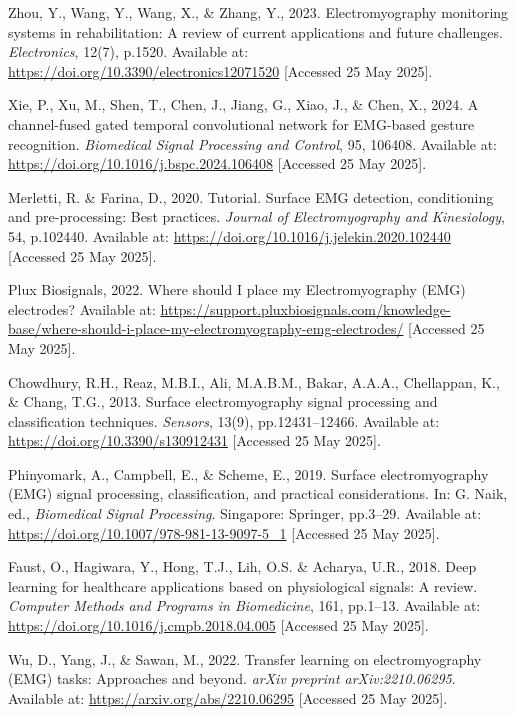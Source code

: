 \begin{multicols}{2}
\begin{thebibliography}{99}\footnotesize 

Zhou, Y., Wang, Y., Wang, X., \& Zhang, Y., 2023. Electromyography monitoring systems in rehabilitation: A review of current applications and future challenges. \textit{Electronics}, 12(7), p.1520. Available at: \url{https://doi.org/10.3390/electronics12071520} [Accessed 25 May 2025].

Xie, P., Xu, M., Shen, T., Chen, J., Jiang, G., Xiao, J., \& Chen, X., 2024. A channel-fused gated temporal convolutional network for EMG-based gesture recognition. \textit{Biomedical Signal Processing and Control}, 95, 106408. Available at: \url{https://doi.org/10.1016/j.bspc.2024.106408} [Accessed 25 May 2025].

Merletti, R. \& Farina, D., 2020. Tutorial. Surface EMG detection, conditioning and pre-processing: Best practices. \textit{Journal of Electromyography and Kinesiology}, 54, p.102440. Available at: \url{https://doi.org/10.1016/j.jelekin.2020.102440} [Accessed 25 May 2025].

Plux Biosignals, 2022. Where should I place my Electromyography (EMG) electrodes? Available at: \url{https://support.pluxbiosignals.com/knowledge-base/where-should-i-place-my-electromyography-emg-electrodes/} [Accessed 25 May 2025].

Chowdhury, R.H., Reaz, M.B.I., Ali, M.A.B.M., Bakar, A.A.A., Chellappan, K., \& Chang, T.G., 2013. Surface electromyography signal processing and classification techniques. \textit{Sensors}, 13(9), pp.12431–12466. Available at: \url{https://doi.org/10.3390/s130912431} [Accessed 25 May 2025].

Phinyomark, A., Campbell, E., \& Scheme, E., 2019. Surface electromyography (EMG) signal processing, classification, and practical considerations. In: G. Naik, ed., \textit{Biomedical Signal Processing}. Singapore: Springer, pp.3–29. Available at: \url{https://doi.org/10.1007/978-981-13-9097-5_1} [Accessed 25 May 2025].

Faust, O., Hagiwara, Y., Hong, T.J., Lih, O.S. \& Acharya, U.R., 2018. Deep learning for healthcare applications based on physiological signals: A review. \textit{Computer Methods and Programs in Biomedicine}, 161, pp.1–13. Available at: \url{https://doi.org/10.1016/j.cmpb.2018.04.005} [Accessed 25 May 2025].

Wu, D., Yang, J., \& Sawan, M., 2022. Transfer learning on electromyography (EMG) tasks: Approaches and beyond. \textit{arXiv preprint arXiv:2210.06295}. Available at: \url{https://arxiv.org/abs/2210.06295} [Accessed 25 May 2025].


\end{thebibliography}
\end{multicols}
